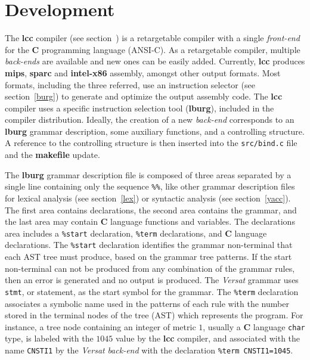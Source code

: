 
\chapter{Development}
\label{chapter:develop}

The {\bf lcc} compiler (see section~\cite{Fraser:1991b,lcc4}) is a
retargetable compiler with a single {\it front-end} for the {\bf C}
programming language ({\sc ANSI-C}).
As a retargetable compiler, multiple {\it back-ends} are available
and new ones can be easily added.
Currently, {\bf lcc} produces {\bf mips}, {\bf sparc} and
{\bf intel-x86} assembly, amongst other output formats.
Most formats, including the three referred, use an instruction
selector (see section~\ref{burg}) to generate and optimize the
output assembly code.
The {\bf lcc} compiler uses a specific instruction selection
tool ({\bf lburg}), included in the compiler distribution.
Ideally, the creation of a new {\it back-end} corresponds to an
{\bf lburg} grammar description, some auxiliary functions,
and a controlling structure.
A reference to the controlling structure is then inserted
into the {\tt src/bind.c} file and the {\bf makefile} update.

The {\bf lburg} grammar description file is composed of three
areas separated by a single line containing only the sequence
{\tt \%\%}, like other grammar description files for lexical
analysis (see section~\ref{lex}) or syntactic analysis
(see section~\ref{yacc}).
The first area contains declarations, the second area
contains the grammar, and the last area may contain
{\bf C} language functions and variables.
The declarations area includes a {\tt \%start} declaration,
{\tt \%term} declarations, and {\bf C} language declarations.
The {\tt \%start} declaration identifies the grammar
non-terminal that each {\sc AST} tree must produce,
based on the grammar tree patterns. If the start
non-terminal can not be produced from any combination
of the grammar rules, then an error is generated and
no output is produced. The {\it Versat} grammar uses
{\tt stmt}, or statement, as the start symbol for the grammar.
The {\tt \%term} declaration associates a symbolic name used
in the patterns of each rule with the number stored in the
terminal nodes of the tree ({\sc AST}) which represents
the program.
For instance, a tree node containing an integer of metric $1$,
usually a {\bf C} language {\tt char} type, is labeled with
the $1045$ value by the {\bf lcc} compiler, and associated
with the name {\tt CNSTI1} by the {\it Versat} {\it back-end}
with the declaration {\tt \%term CNSTI1=1045}.


